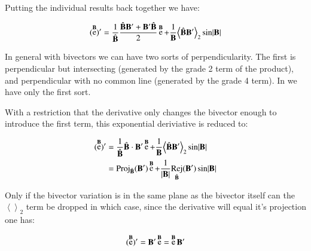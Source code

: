 \documentclass{article}      %
\DeclareMathOperator{\Exp}{e}
\DeclareMathOperator{\Rej}{Rej}
\newcommand{\Bcap}[0]{\hat{\BB}}
\newcommand{\Babs}[0]{\abs{\BB}}
\newcommand{\gpgrade}[2] {{\left\langle{{#1}}\right\rangle}_{#2}}
\newcommand{\gpgradetwo}[1] {\gpgrade{#1}{2}}
\begin{document}
Putting the individual results back together we have:

\begin{equation}
(\Exp^{\BB})'
= \inv{\Bcap}\frac{\Bcap\BB' + \BB'\Bcap}{2} \Exp^{\BB} + \inv{\BB}\gpgradetwo{\Bcap\BB'} \sin\Babs 
\end{equation}

In general with bivectors we can have two sorts of perpendicularity.  The first is perpendicular but intersecting (generated by the grade 2 term of the product), and perpendicular with no common line (generated by the grade 4 term).
In  we have only the first sort.

With a restriction that the derivative only changes the bivector enough to introduce the first term, this
exponential deriviative is reduced to:

\begin{align*}
(\Exp^{\BB})'
&= \inv{\Bcap}\Bcap \cdot \BB' \Exp^{\BB} + \inv{\BB}\gpgradetwo{\Bcap\BB'} \sin\Babs \\
&= \Proj_{\Bcap}(\BB') \Exp^{\BB} + \inv{\Babs}{\Rej_{\Bcap}(\BB')} \sin\Babs \\
\end{align*}

Only if the bivector variation is in the same plane as the bivector itself can the $\gpgradetwo{}$ term be dropped
in which case, since the derivative will equal it's projection one has:

\begin{equation}
(\Exp^{\BB})' = \BB' \Exp^{\BB} = \Exp^{\BB} \BB' 
\end{equation}
\end{document}
